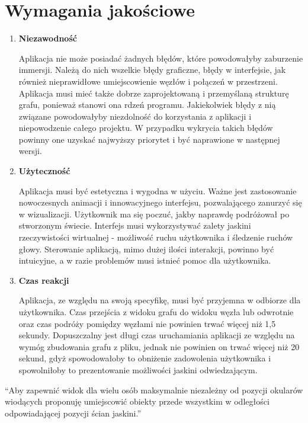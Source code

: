 \section{Wymagania jakościowe}
\begin{enumerate}[label=\textbullet]
\item \textbf{Niezawodność}

Aplikacja nie może posiadać żadnych błędów, które powodowałyby zaburzenie immersji. Należą do nich wszelkie błędy graficzne, błędy w interfejsie, jak również nieprawidłowe umiejscowienie węzłów i połączeń w przestrzeni. Aplikacja musi mieć także dobrze zaprojektowaną i przemyślaną strukturę grafu, ponieważ stanowi ona rdzeń programu. Jakiekolwiek błędy z nią związane powodowałyby niezdolność do korzystania z aplikacji i niepowodzenie całego projektu. W przypadku wykrycia takich błędów powinny one uzyskać najwyższy priorytet i być naprawione w następnej wersji.

\item \textbf{Użyteczność}

Aplikacja musi być estetyczna i wygodna w użyciu. Ważne jest zastosowanie nowoczesnych animacji i innowacyjnego interfejsu, pozwalającego zanurzyć się w wizualizacji. Użytkownik ma się poczuć, jakby naprawdę podróżował po stworzonym świecie. Interfejs musi wykorzystywać zalety jaskini rzeczywistości wirtualnej - możliwość ruchu użytkownika i śledzenie ruchów głowy. Sterowanie aplikacją, mimo dużej ilości interakcji, powinno być intuicyjne, a w razie problemów musi istnieć pomoc dla użytkownika.

\item \textbf{Czas reakcji}

Aplikacja, ze względu na swoją specyfikę, musi być przyjemna w odbiorze dla użytkownika. Czas przejścia z widoku grafu do widoku węzła lub odwrotnie oraz czas podróży pomiędzy węzłami nie powinien trwać więcej niż 1,5 sekundy. Dopuszczalny jest długi czas uruchamiania aplikacji ze względu na wymóg zbudowania grafu z pliku, jednak nie powinien on trwać więcej niż 20 sekund, gdyż spowodowałoby to obniżenie zadowolenia użytkownika i spowolniłoby to prezentowanie możliwości jaskini odwiedzającym. 
\end{enumerate}

``Aby zapewnić widok dla wielu osób maksymalnie niezależny od pozycji okularów wiodących proponuję umiejscowić obiekty przede wszystkim w odległości odpowiadającej pozycji ścian jaskini.''
